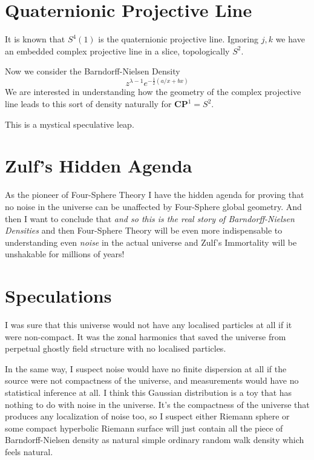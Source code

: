 \documentclass{amsart}
\author{Zulfikar Moinuddin Ahmed}
\date{\today}
\begin{document}
\maketitle

\section{Quaternionic Projective Line}

It is known that $S^4(1)$ is the quaternionic projective line.  Ignoring $j,k$ we have an embedded complex projective line in a slice, topologically $S^2$.

Now we consider the Barndorff-Nielsen Density
\[
z^{\lambda-1} e^{-\frac{1}{2}(a/x + bx)}
\]
We are interested in understanding how the geometry of the complex projective line leads to this sort of density naturally for $\mathbf{CP}^1=S^2$.  

This is a mystical speculative leap.  

\section{Zulf's Hidden Agenda}

As the pioneer of Four-Sphere Theory I have the hidden agenda for proving that no noise in the universe can be unaffected by Four-Sphere global geometry.  And then I want to conclude that {\em and so this is the real story of Barndorff-Nielsen Densities} and then Four-Sphere Theory will be even more indispensable to understanding even {\em noise} in the actual universe and Zulf's Immortality will be unshakable for millions of years!

\section{Speculations}

I was sure that this universe would not have any localised particles at all if it were non-compact.  It was the zonal harmonics that saved the universe from perpetual ghostly field structure with no localised particles.

In the same way, I suspect noise would have no finite dispersion at all if the source were not compactness of the universe, and measurements would have no statistical inference at all.  I think this Gaussian distribution is a toy that has nothing to do with noise in the universe.  It's the compactness of the universe that produces any localization of noise too, so I suspect either Riemann sphere or some compact hyperbolic Riemann surface will  just contain all the piece of Barndorff-Nielsen density as natural simple ordinary random walk density which feels natural.  
\end{document}
